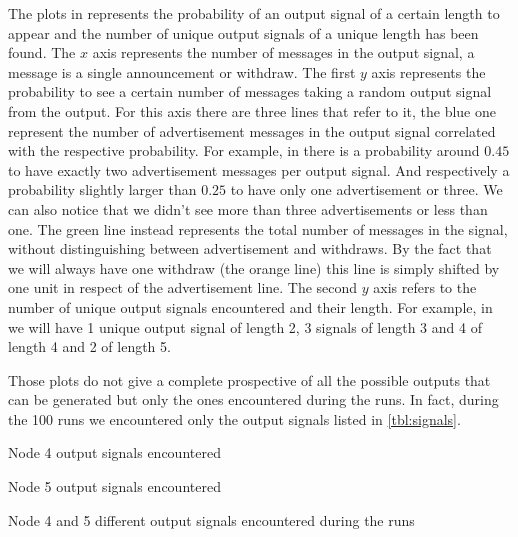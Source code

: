 The plots in  represents the probability of an
output signal of a certain length to appear and the number of unique output signals
of a unique length has been found.
The $x$ axis represents the number of messages in the output signal, a message
is a single announcement or withdraw.
The first $y$ axis represents the probability to see a certain number of messages
taking a random output signal from the output.
For this axis there are three lines that refer to it, the blue one represent the
number of advertisement messages in the output signal correlated with the 
respective probability.
For example, in  there is a probability around $0.45$ to have
exactly two advertisement messages per output signal. And respectively a probability
slightly larger than $0.25$ to have only one advertisement or three.
We can also notice that we didn't see more than three advertisements or less than one.
The green line instead represents the total number of messages in the signal,
without distinguishing between advertisement and withdraws.
By the fact that we will always have one withdraw (the orange line) this line 
is simply shifted by one unit in respect of the advertisement line.
The second $y$ axis refers to the number of unique output signals encountered and
their length.
For example, in  we will have \num{1} unique output signal
of length \num{2}, \num{3} signals of length \num{3} and \num{4} of length \num{4} and \num{2} of length \num{5}.

Those plots do not give a complete prospective of all the possible outputs
that can be generated but only the ones encountered during the runs.
In fact, during the \num{100} runs we encountered only the output signals listed
in \cref{tbl:signals}.

\begin{table}[h]
	\begin{subtable}[h]{0.45\textwidth}
		
		\caption{Node \num{4} output signals encountered}
		\label{tab:node4_outSignals}
    \end{subtable}
	\hfill
	\begin{subtable}[h]{0.45\textwidth}
		
		\caption{Node \num{5} output signals encountered}
		\label{tab:node5_outSignals}
    \end{subtable}
	\caption{Node 4 and 5 different output signals encountered during the runs}
	\label{tbl:signals}
\end{table}


